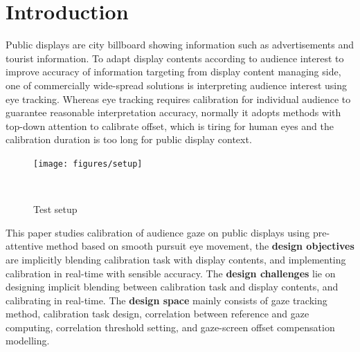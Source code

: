 \documentclass{sigchi}
\begin{document}
\section{Introduction}

Public displays are city billboard showing information such as advertisements and tourist information. To adapt display contents according to audience interest to improve accuracy of information targeting from display content managing side, one of commercially wide-spread solutions is interpreting audience interest using eye tracking. Whereas eye tracking requires calibration for individual audience to guarantee reasonable interpretation accuracy, normally it adopts methods with top-down attention to calibrate offset, which is tiring for human eyes and the calibration duration is too long for public display context. 
\begin{figure}[h!]
  \centering
  \texttt{[image: figures/setup]}\\
\caption{Test setup}~\label{fig:figure2}
\end{figure} 
This paper studies calibration of audience gaze on public displays using pre-attentive method based on smooth pursuit eye movement, the \textbf{design objectives} are implicitly blending calibration task with display contents, and implementing calibration in real-time with sensible accuracy.
The \textbf{design challenges} lie on designing implicit blending between calibration task and display contents, and calibrating in real-time. The \textbf{design space} mainly consists of gaze tracking method, calibration task design, correlation between reference and gaze computing, correlation threshold setting, and gaze-screen offset compensation modelling.
\end{document}
